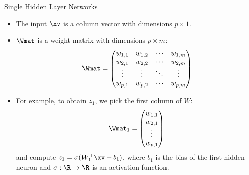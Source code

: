 \begin{vbframe} {Single Hidden Layer Networks}

  \begin{itemize}
    \item The input $\xv$ is a column vector with dimensions $p \times 1$. 
    \item $\Wmat$ is a weight matrix with dimensions $p \times m$:
    $$
    \Wmat =
     \begin{pmatrix}
      w_{1,1} & w_{1,2} & \cdots & w_{1,m} \\
      w_{2,1} & w_{2,2} & \cdots & w_{2,m} \\
      \vdots  & \vdots  & \ddots & \vdots  \\
      w_{p,1} & w_{p,2} & \cdots & w_{p,m}
     \end{pmatrix}
    $$
    \item For example, to obtain $z_1$, we pick the first column of $W$:
    $$
    \Wmat_1 =
     \begin{pmatrix}
      w_{1,1} \\
      w_{2,1} \\
      \vdots  \\
      w_{p,1}
     \end{pmatrix}
    $$
    and compute $z_1 = \sigma(W_1^\top \xv + b_1)$, where $b_1$ is the bias of the first hidden neuron and $\sigma: \R \to \R$ is an activation function. 
  \end{itemize}
\end{vbframe}

